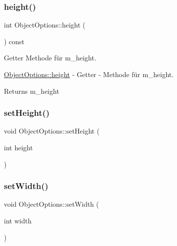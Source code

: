 \subsubsection{\texorpdfstring{height()}{height()}}
{\footnotesize\ttfamily int Object\+Options\+::height (\begin{DoxyParamCaption}{ }\end{DoxyParamCaption}) const}



Getter Methode für m\+\_\+height. 

\hyperlink{class_object_options_af520e91fb7c4980c04e21f1a306264b1}{Object\+Options\+::height} -\/ Getter -\/ Methode für m\+\_\+height.

\begin{DoxyReturn}{Returns}
m\+\_\+height


\end{DoxyReturn}
\mbox{\label{class_object_options_a7e490c997a49ddd45317598dc851f473}} 
\subsubsection{\texorpdfstring{set\+Height()}{setHeight()}}
{\footnotesize\ttfamily void Object\+Options\+::set\+Height (\begin{DoxyParamCaption}\item[{int}]{height }\end{DoxyParamCaption})}

\mbox{\label{class_object_options_a33cd9c2ae781069d22babab1ac346af9}} 
\subsubsection{\texorpdfstring{set\+Width()}{setWidth()}}
{\footnotesize\ttfamily void Object\+Options\+::set\+Width (\begin{DoxyParamCaption}\item[{int}]{width }\end{DoxyParamCaption})}

\mbox{\label{class_object_options_acdb5c1b9952fda67ac8393055acfd756}} 
